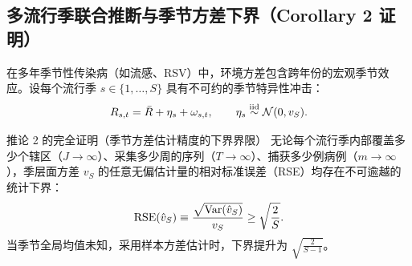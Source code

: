 \subsection{多流行季联合推断与季节方差下界（Corollary 2 证明）}

在多年季节性传染病（如流感、RSV）中，环境方差包含跨年份的宏观季节效应。设每个流行季 $s \in \{1, \dots, S\}$ 具有不可约的季节特异性冲击：
\begin{equation}
  R_{s, t} = \bar{R} + \eta_s + \omega_{s, t}, \qquad \eta_s \overset{\text{iid}}{\sim} \mathcal{N}(0, v_S).
\end{equation}

\begin{theorembox}{推论 2 的完全证明（季节方差估计精度的下界界限）}
无论每个流行季内部覆盖多少个辖区（$J \to \infty$）、采集多少周的序列（$T \to \infty$）、捕获多少例病例（$m \to \infty$），季层面方差 $v_S$ 的任意无偏估计量的相对标准误差（RSE）均存在不可逾越的统计下界：
\begin{equation}
  \text{RSE}(\hat{v}_S) \equiv \frac{\sqrt{\mathrm{Var}(\hat{v}_S)}}{v_S} \ge \sqrt{\frac{2}{S}}.
  \label{eq:rse-bound}
\end{equation}
当季节全局均值未知，采用样本方差估计时，下界提升为 $\sqrt{\frac{2}{S - 1}}$。
\end{theorembox}

